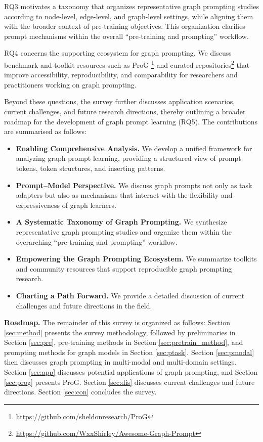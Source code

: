 RQ3 motivates a taxonomy that organizes representative graph prompting studies according to node-level, edge-level, and graph-level settings, while aligning them with the broader context of pre-training objectives. This organization clarifies prompt mechanisms within the overall ``pre-training and prompting'' workflow.

RQ4 concerns the supporting ecosystem for graph prompting. We discuss benchmark and toolkit resources such as ProG \footnote{\url{https://github.com/sheldonresearch/ProG}} and curated repositories\footnote{\url{https://github.com/WxxShirley/Awesome-Graph-Prompt}} that improve accessibility, reproducibility, and comparability for researchers and practitioners working on graph prompting.

Beyond these questions, the survey further discusses application scenarios, current challenges, and future research directions, thereby outlining a broader roadmap for the development of graph prompt learning (RQ5). The contributions are summarised as follows:

\begin{itemize}
    \item \textbf{Enabling Comprehensive Analysis.} We develop a unified framework for analyzing graph prompt learning, providing a structured view of prompt tokens, token structures, and inserting patterns.
    \item \textbf{Prompt--Model Perspective. } We discuss graph prompts not only as task adapters but also as mechanisms that interact with the flexibility and expressiveness of graph learners.
    \item \textbf{A Systematic Taxonomy of Graph Prompting. } We synthesize representative graph prompting studies and organize them within the overarching ``pre-training and prompting'' workflow.
    \item \textbf{Empowering the Graph Prompting Ecosystem. } We summarize toolkits and community resources that support reproducible graph prompting research.
    \item \textbf{Charting a Path Forward. } We provide a detailed discussion of current challenges and future directions in the field.
\end{itemize}


\textbf{Roadmap.} The remainder of this survey is organized as follows: Section \ref{sec:method} presents the survey methodology, followed by preliminaries in Section \ref{sec:pre}, pre-training methods in Section \ref{sec:pretrain_method}, and prompting methods for graph models in Section \ref{sec:ptask}. Section \ref{sec:pmodal} then discusses graph prompting in multi-modal and multi-domain settings. Section \ref{sec:app} discusses potential applications of graph prompting, and Section \ref{sec:prog} presents ProG. Section \ref{sec:dis} discusses current challenges and future directions. Section \ref{sec:con} concludes the survey.
